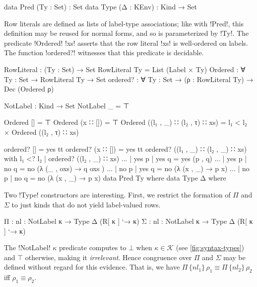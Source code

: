 \begin{AgdaAlign}
\begin{code} 
  data Pred (Ty : Set) : Set
  data Type (Δ : KEnv) : Kind → Set
\end{code}

Row literals are defined as lists of label-type associations; like with !Pred!, this definition may be reused for normal forms, and so is parameterized by !Ty!. The predicate !Ordered! !xs! asserts that the row literal !xs! is well-ordered on labels. The function !ordered?! witnesses that this predicate is decidable.

\begin{code}
  RowLiteral : (Ty : Set) → Set 
  RowLiteral Ty = List (Label × Ty)
  Ordered  : ∀ {Ty : Set} → RowLiteral Ty → Set 
  ordered? : ∀ {Ty : Set} → (ρ : RowLiteral Ty) → 
             Dec (Ordered ρ) 
\end{code}
\begin{code}[hide]
  NotLabel : Kind → Set
  NotLabel _ = ⊤

  Ordered [] = ⊤
  Ordered (x ∷ []) = ⊤
  Ordered ((l₁ , _) ∷ (l₂ , τ) ∷ xs) = l₁ < l₂ × Ordered ((l₂ , τ) ∷ xs)
  
  ordered? [] = yes tt
  ordered? (x ∷ []) = yes tt
  ordered? ((l₁ , _) ∷ (l₂ , _) ∷ xs) with l₁ <? l₂ | ordered? ((l₂ , _) ∷ xs)
  ... | yes p | yes q  = yes (p , q)
  ... | yes p | no q  = no (λ { (_ , oxs) → q oxs })
  ... | no p  | yes q  = no (λ { (x , _) → p x})
  ... | no  p | no  q  = no (λ { (x , _) → p x})
  data Pred Ty where
  data Type Δ where
\end{code}

Two !Type! constructors are interesting. First, we restrict the formation of $\Pi$ and $\Sigma$ to just kinds that do not yield label-valued rows. %

\begin{code} 
    Π     : {nl : NotLabel κ} → Type Δ (R[ κ ] `→ κ)
    Σ     : {nl : NotLabel κ} → Type Δ (R[ κ ] `→ κ)
\end{code}
\end{AgdaAlign}

The !NotLabel! $\kappa$ predicate computes to $\bot$ when $\kappa \in \mathcal K$ (see \cref{fig:syntax-types}) and $\top$ otherwise, making it \emph{irrelevant}. Hence congruence over $\Pi$ and $\Sigma$ may be defined without regard for this evidence. That is, we have $\Pi\, \{nl_{1}\}\, \rho_{1} \equiv \Pi\, \{nl_2\}\, \rho_2$ iff $\rho_1 \equiv \rho_2$.

